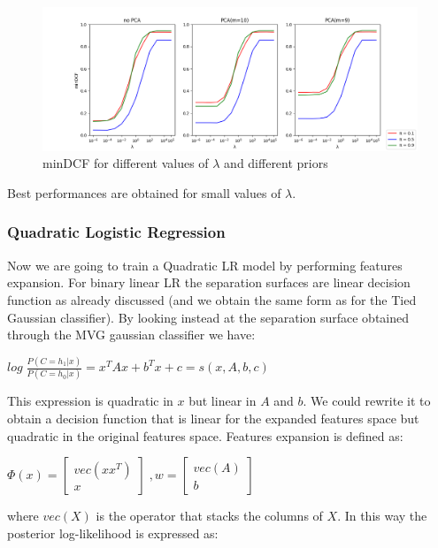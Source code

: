\documentclass[10pt, a4paper, twocolumn]{article} %
\begin{document}
\begin{figure}[ht!]
	\includegraphics[width=\linewidth]{./Pictures/FeaturesAnalysis/dcfplotLLR.png}
	\caption{minDCF for different values of $\lambda$ and different priors}
	\label{dcfLLR} 
\end{figure}
Best performances are obtained for small values of $\lambda$.
\subsubsection{Quadratic Logistic Regression}
Now we are going to train a Quadratic LR model by performing features expansion.
For binary linear LR the separation surfaces are linear decision function as already discussed (and
we obtain the same form as for the Tied Gaussian classifier). By looking instead at the separation surface
obtained through the MVG gaussian classifier we have:
\begin{center}
	\begin{math}
		log\;\frac{P(C=h_1|x)}{P(C=h_0|x)} = x^TAx + b^Tx + c = s(x, A, b, c)
	\end{math}
\end{center}
This expression is quadratic in $x$ but linear in $A$ and $b$. 
We could rewrite it to obtain a decision function that is linear for the expanded features space
but quadratic in the original features space. Features expansion is defined as:
\begin{center}
	\begin{math}
		\Phi(x) = \begin{bmatrix}
					vec(xx^T)\\
					x
				  \end{bmatrix} \;, 
		w= 		 \begin{bmatrix}
					vec(A)\\
					b
				  \end{bmatrix}
	\end{math}
\end{center}
where $vec(X)$ is the operator that stacks the columns of $X$. In this way the posterior log-likelihood is expressed as:
\end{document}
